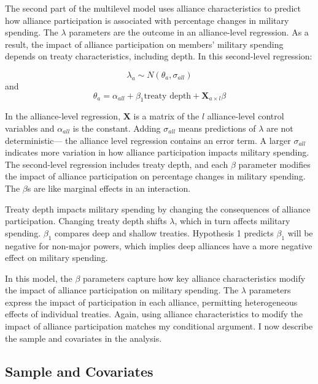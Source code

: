 \documentclass[12pt]{article}
\begin{document}
The second part of the multilevel model uses alliance characteristics to predict how alliance participation is associated with percentage changes in military spending. 
The $\lambda$ parameters are the outcome in an alliance-level regression.
As a result, the impact of alliance participation on members' military spending depends on treaty characteristics, including depth. 
In this second-level regression: 


\begin{equation}
\lambda_{a} \sim N(\theta_{a}, \sigma_{all})
\end{equation} 
and 
\begin{equation}
\theta_{a} = \alpha_{all} + \beta_1 \mbox{treaty depth} + \textbf{X}_{a \times l} \beta
\end{equation}


In the alliance-level regression, $\textbf{X}$ is a matrix of the $l$ alliance-level control variables and $\alpha_{all}$ is the constant.
Adding $\sigma_{all}$ means predictions of $\lambda$ are not deterministic--- the alliance level regression contains an error term. 
A larger $\sigma_{all}$ indicates more variation in how alliance participation impacts military spending. 
The second-level regression includes treaty depth, and each $\beta$ parameter modifies the impact of alliance participation on percentage changes in military spending. 
The $\beta$s are like marginal effects in an interaction. 


Treaty depth impacts military spending by changing the consequences of alliance participation. 
Changing treaty depth shifts $\lambda$, which in turn affects military spending.
$\beta_1$ compares deep and shallow treaties. 
Hypothesis 1 predicts $\beta_1$ will be negative for non-major powers, which implies deep alliances have a more negative effect on military spending. 


In this model, the $\beta$ parameters capture how key alliance characteristics modify the impact of alliance participation on military spending. 
The $\lambda$ parameters express the impact of participation in each alliance, permitting heterogeneous effects of individual treaties. 
Again, using alliance characteristics to modify the impact of alliance participation matches my conditional argument. 
I now describe the sample and covariates in the analysis.  



\subsection{Sample and Covariates} 
\end{document}
